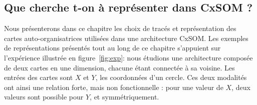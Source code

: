 %
% 


\subsection{Que cherche t-on à représenter dans CxSOM ?}

Nous présenterons dans ce chapitre les choix de tracés et représentation des cartes auto-organisatrices utilisées dans une architecture CxSOM.
Les exemples de représentations présentés tout au long de ce chapitre s'appuient sur l'expérience illustrée en figure~\ref{fig:exp}: nous étudions une architecture composée de deux cartes en une dimension, chacune étant connectée à sa voisine. Les entrées des cartes sont $X$ et $Y$, les coordonnées d'un cercle. Ces deux modalités ont ainsi une relation forte, mais non fonctionnelle : pour une valeur de $X$, deux valeurs sont possible pour $Y$, et symmétriquement.

